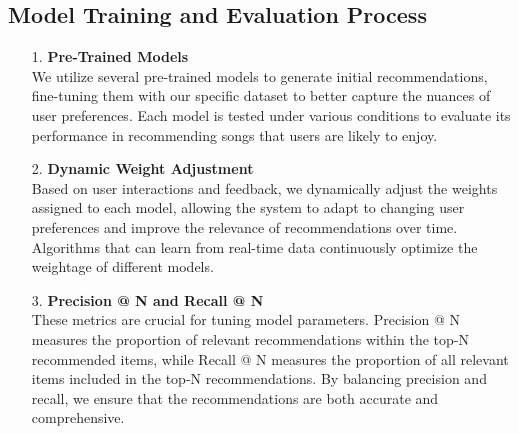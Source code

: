 \documentclass[9pt,twocolumn,twoside,lineno]{gsajnl}
\begin{document}
\subsection{Model Training and Evaluation Process} 
\begin{itemize}
    \item[1. ] \textbf{Pre-Trained Models}\\We utilize several pre-trained models to generate initial recommendations, fine-tuning them with our specific dataset to better capture the nuances of user preferences. Each model is tested under various conditions to evaluate its performance in recommending songs that users are likely to enjoy.
    \item[2. ] \textbf{Dynamic Weight Adjustment}\\Based on user interactions and feedback, we dynamically adjust the weights assigned to each model, allowing the system to adapt to changing user preferences and improve the relevance of recommendations over time. Algorithms that can learn from real-time data continuously optimize the weightage of different models.
    \item[3. ] \textbf{Precision @ N and Recall @ N}\\These metrics are crucial for tuning model parameters. Precision @ N measures the proportion of relevant recommendations within the top-N recommended items, while Recall @ N measures the proportion of all relevant items included in the top-N recommendations. By balancing precision and recall, we ensure that the recommendations are both accurate and comprehensive.
\end{itemize}

\nocite{*}

\end{document}
